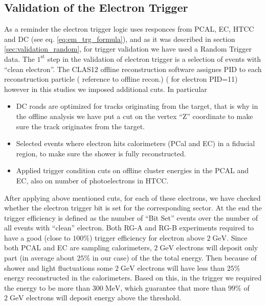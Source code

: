 \subsection{Validation of the Electron Trigger}
\label{elctron_trigger_validation}
As a reminder the electron trigger logic uses responces from PCAL, EC, HTCC and DC (see eq. \ref{eq:em_trg_formula}), and as it was described in section \ref{sec:validation_random}, for trigger validation we have used a Random Trigger data. 
The $\mathrm{1^{st}}$ step in the validation of electron trigger is a selection of  events with ``clean electron''. The CLAS12 offline reconstruction software assignes PID to each reconstruction particle ({\color{Red} reference to offline recon.}) ( for electron PID=11) however in this studies we imposed additional cuts. 
In particular 
\begin{itemize}
 \item DC roads are optimized for tracks originating from the target, that is why in the offline analysis we have put a cut on the vertex ``Z'' coordinate to make sure the track originates from the target.
 \item Selected events where electron hits calorimeters (PCal and EC) in a fiducial region, to make sure the shower is fully reconstructed.
 \item Applied trigger condition cuts on offline cluster energies in the PCAL and EC, also on number of photoelectrons in HTCC.
\end{itemize}
After applying above mentioned cuts, for each of these electrons, we have checked whether the electron trigger bit is set for the corresponding sector. At the end the trigger efficiency is defined as the number of ``Bit  Set'' events over the number of all events with ``clean'' electron.
Both RG-A and RG-B experiments required to have a good (close to $100 \%$) trigger efficiency for electron above $\mathrm{2\;GeV}$. Since both PCAL and EC are sampling calorimeters, $\mathrm{2\;GeV}$ electrons will deposit only part (in average about $25\%$ in our case) of the the total energy. Then because of shower and light fluctuations some $\mathrm{2\;GeV}$ electrons will have less than $\mathrm{25\%}$ energy reconstructed in the calorimeters. Based on this, in the trigger we required the energy to be more than $\mathrm{300 \; MeV}$, which guarantee that more than $\mathrm{99\%}$ of $\mathrm{2\;GeV}$ electrons will deposit energy above the threshold.

